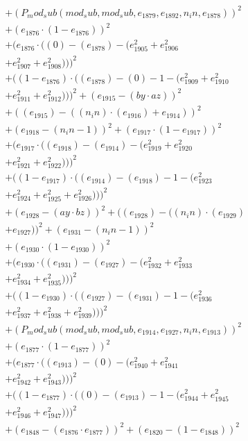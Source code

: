 \documentclass[10pt, a4paper]{article}
\begin{document}
\begin{align*}
& + (P_mod_sub(mod_sub, mod_sub, e_{1879}, e_{1892}, n_in, e_{1878}))^{2} \\
& + (e_{1876}  \cdot  (1 - e_{1876}))^{2} \\
& + (e_{1876}  \cdot  ((0) - (e_{1878}) - (e_{1905}^{2} + e_{1906}^{2} \\
& + e_{1907}^{2} + e_{1908}^{2})))^{2} \\
& + ((1 - e_{1876})  \cdot  ((e_{1878}) - (0) - 1 - (e_{1909}^{2} + e_{1910}^{2} \\
& + e_{1911}^{2} + e_{1912}^{2})))^{2} + (e_{1915} - (by  \cdot  az))^{2} \\
& + ((e_{1915}) - ((n_in)  \cdot  (e_{1916}) + e_{1914}))^{2} \\
& + (e_{1918} - (n_in - 1))^{2} + (e_{1917}  \cdot  (1 - e_{1917}))^{2} \\
& + (e_{1917}  \cdot  ((e_{1918}) - (e_{1914}) - (e_{1919}^{2} + e_{1920}^{2} \\
& + e_{1921}^{2} + e_{1922}^{2})))^{2} \\
& + ((1 - e_{1917})  \cdot  ((e_{1914}) - (e_{1918}) - 1 - (e_{1923}^{2} \\
& + e_{1924}^{2} + e_{1925}^{2} + e_{1926}^{2})))^{2} \\
& + (e_{1928} - (ay  \cdot  bz))^{2} + ((e_{1928}) - ((n_in)  \cdot  (e_{1929}) \\
& + e_{1927}))^{2} + (e_{1931} - (n_in - 1))^{2} \\
& + (e_{1930}  \cdot  (1 - e_{1930}))^{2} \\
& + (e_{1930}  \cdot  ((e_{1931}) - (e_{1927}) - (e_{1932}^{2} + e_{1933}^{2} \\
& + e_{1934}^{2} + e_{1935}^{2})))^{2} \\
& + ((1 - e_{1930})  \cdot  ((e_{1927}) - (e_{1931}) - 1 - (e_{1936}^{2} \\
& + e_{1937}^{2} + e_{1938}^{2} + e_{1939}^{2})))^{2} \\
& + (P_mod_sub(mod_sub, mod_sub, e_{1914}, e_{1927}, n_in, e_{1913}))^{2} \\
& + (e_{1877}  \cdot  (1 - e_{1877}))^{2} \\
& + (e_{1877}  \cdot  ((e_{1913}) - (0) - (e_{1940}^{2} + e_{1941}^{2} \\
& + e_{1942}^{2} + e_{1943}^{2})))^{2} \\
& + ((1 - e_{1877})  \cdot  ((0) - (e_{1913}) - 1 - (e_{1944}^{2} + e_{1945}^{2} \\
& + e_{1946}^{2} + e_{1947}^{2})))^{2} \\
& + (e_{1848} - (e_{1876}  \cdot  e_{1877}))^{2} + (e_{1820} - (1 - e_{1848}))^{2} \\

\end{align*}
\end{document}
